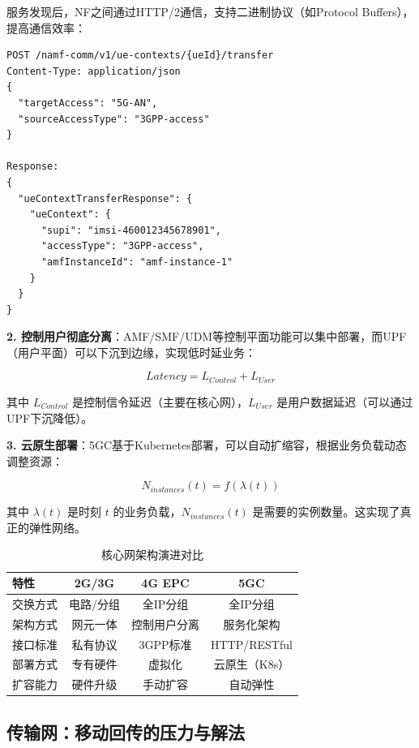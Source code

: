 服务发现后，NF之间通过HTTP/2通信，支持二进制协议（如Protocol Buffers），提高通信效率：

\begin{verbatim}
POST /namf-comm/v1/ue-contexts/{ueId}/transfer
Content-Type: application/json
{
  "targetAccess": "5G-AN",
  "sourceAccessType": "3GPP-access"
}

Response:
{
  "ueContextTransferResponse": {
    "ueContext": {
      "supi": "imsi-460012345678901",
      "accessType": "3GPP-access",
      "amfInstanceId": "amf-instance-1"
    }
  }
}
\end{verbatim}

\textbf{2. 控制用户彻底分离}：AMF/SMF/UDM等控制平面功能可以集中部署，而UPF（用户平面）可以下沉到边缘，实现低时延业务：

\begin{equation}
Latency = L_{Control} + L_{User}
\end{equation}

其中 $L_{Control}$ 是控制信令延迟（主要在核心网），$L_{User}$ 是用户数据延迟（可以通过UPF下沉降低）。

\textbf{3. 云原生部署}：5GC基于Kubernetes部署，可以自动扩缩容，根据业务负载动态调整资源：

\begin{equation}
N_{instances}(t) = f(\lambda(t))
\end{equation}

其中 $\lambda(t)$ 是时刻 $t$ 的业务负载，$N_{instances}(t)$ 是需要的实例数量。这实现了真正的弹性网络。

\begin{table}[htbp]
\centering
\caption{核心网架构演进对比}
\begin{tabular}{|l|c|c|c|}
\hline
\textbf{特性} & \textbf{2G/3G} & \textbf{4G EPC} & \textbf{5GC} \\
\hline
交换方式 & 电路/分组 & 全IP分组 & 全IP分组 \\
架构方式 & 网元一体 & 控制用户分离 & 服务化架构 \\
接口标准 & 私有协议 & 3GPP标准 & HTTP/RESTful \\
部署方式 & 专有硬件 & 虚拟化 & 云原生（K8s） \\
扩容能力 & 硬件升级 & 手动扩容 & 自动弹性 \\
\hline
\end{tabular}
\end{table}

\subsection{传输网：移动回传的压力与解法}

